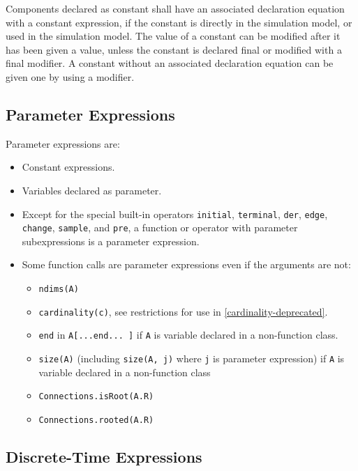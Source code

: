 Components declared as constant shall have an associated declaration
equation with a constant expression, if the constant is directly in the
simulation model, or used in the simulation model. The value of a
constant can be modified after it has been given a value, unless the
constant is declared final or modified with a final modifier. A constant
without an associated declaration equation can be given one by using a
modifier.

\subsection{Parameter Expressions}

Parameter expressions are:

\begin{itemize}
\item
  Constant expressions.
\item
  Variables declared as parameter.
\item
  Except for the special built-in operators \lstinline!initial!, \lstinline!terminal!, \lstinline!der!,
  \lstinline!edge!, \lstinline!change!, \lstinline!sample!, and \lstinline!pre!, a function or operator with parameter
  subexpressions is a parameter expression.
\item
  Some function calls are parameter expressions even if the arguments
  are not:

  \begin{itemize}
  \item
    \lstinline!ndims(A)!
  \item
    \lstinline!cardinality(c)!, see restrictions for use in \autoref{cardinality-deprecated}.
  \item
    \lstinline!end! in \lstinline!A[...end... ]! if \lstinline!A! is variable declared in a  non-function class.
  \item
    \lstinline!size(A)! (including \lstinline!size(A, j)! where \lstinline!j! is parameter expression) if \lstinline!A!
    is variable declared in a non-function class
  \item
    \lstinline!Connections.isRoot(A.R)!
  \item
    \lstinline!Connections.rooted(A.R)!
  \end{itemize}
\end{itemize}

\subsection{Discrete-Time Expressions}

